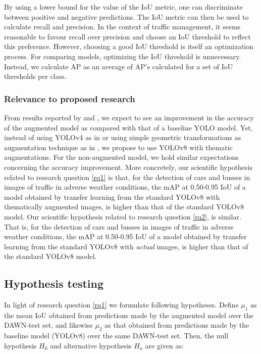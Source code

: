 \documentclass[]{article}
\begin{document}
	By using a lower bound for the value of the IoU metric, one can discriminate between positive and negative predictions. The IoU metric can then be used to calculate recall and precision. In the context of traffic management, it seems reasonable to favour recall over precision and choose an IoU threshold to reflect this preference. However, choosing a good IoU threshold is itself an optimization process. For comparing models, optimizing the IoU threshold is unnecessary. Instead, we calculate AP as an average of AP's calculated for a set of IoU thresholds per class.
	
\subsubsection{Relevance to proposed research}
	
	From results reported by \cite{kumarObjectDetectionAdverse2023} and \cite{liVehicleDetectionFoggy2022}, we expect to see an improvement in the accuracy of the augmented model as compared with that of a baseline YOLO model. Yet, instead of using YOLO{\small v4} as in \cite{liVehicleDetectionFoggy2022} or using simple geometric transformations as augmentation technique as in \cite{kumarObjectDetectionAdverse2023}, we propose to use YOLO{\small v8} with thematic augmentations. For the non-augmented model, we hold similar expectations concerning the accuracy improvement. More concretely, our scientific hypothesis related to research question \ref{rq1} is that, for the detection of cars and busses in images of traffic in adverse weather conditions, the mAP at 0.50-0.95 IoU of a model obtained by transfer learning from the standard YOLO{\small v8} with thematically augmented images, is higher than that of the standard YOLO{\small v8} model. Our scientific hypothesis related to research question \ref{rq2}, is similar. That is, for the detection of cars and busses in images of traffic in adverse weather conditions, the mAP at 0.50-0.95 IoU of a model obtained by transfer learning from the standard YOLO{\small v8} with  \textit{actual} images, is higher than that of the standard YOLO{\small v8} model.

\subsection{Hypothesis testing}
	
	In light of research question \ref{rq1} we formulate following hypotheses. Define $\mu_1$ as the mean IoU obtained from predictions made by the augmented model over the DAWN-test set, and likewise $\mu_2$ as that obtained from predictions made by the baseline model (YOLO{\small v8}) over the same DAWN-test set. Then, the null hypothesis $H_0$ and alternative hypothesis $H_a$ are given as:
	
\end{document}
